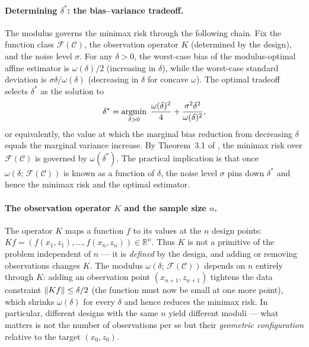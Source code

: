 \paragraph{Determining $\delta^*$: the bias--variance tradeoff.}
The modulus governs the minimax risk through the following chain.
Fix the function class $\mathcal{F}(\mathcal{C})$, the observation operator $K$ (determined by the design), and the noise level $\sigma$.
For any $\delta > 0$, the worst-case bias of the modulus-optimal affine estimator is $\omega(\delta)/2$ (increasing in $\delta$), while the worst-case standard deviation is $\sigma \delta / \omega(\delta)$ (decreasing in $\delta$ for concave $\omega$).
The optimal tradeoff selects $\delta^*$ as the solution to
\begin{equation}\label{eq:app_delta_star}
	\delta^* = \operatorname*{argmin}_{\delta > 0}\; \frac{\omega(\delta)^2}{4} + \frac{\sigma^2 \delta^2}{\omega(\delta)^2},
\end{equation}
or equivalently, the value at which the marginal bias reduction from decreasing $\delta$ equals the marginal variance increase.
By Theorem~3.1 of \textcite{armstrong_optimal_2018}, the minimax risk over $\mathcal{F}(\mathcal{C})$ is governed by $\omega(\delta^*)$.
The practical implication is that once $\omega(\delta;\, \mathcal{F}(\mathcal{C}))$ is known as a function of $\delta$, the noise level $\sigma$ pins down $\delta^*$ and hence the minimax risk and the optimal estimator.

\paragraph{The observation operator $K$ and the sample size $n$.}
The operator $K$ maps a function $f$ to its values at the $n$ design points: $Kf = (f(x_1, z_1), \ldots, f(x_n, z_n)) \in \mathbb{R}^n$.
Thus $K$ is not a primitive of the problem independent of $n$ --- it is \emph{defined} by the design, and adding or removing observations changes $K$.
The modulus $\omega(\delta;\, \mathcal{F}(\mathcal{C}))$ depends on $n$ entirely through $K$: adding an observation point $(x_{n+1}, z_{n+1})$ tightens the data constraint $\lVert Kf\rVert \leq \delta/2$ (the function must now be small at one more point), which shrinks $\omega(\delta)$ for every $\delta$ and hence reduces the minimax risk.
In particular, different designs with the same $n$ yield different moduli --- what matters is not the number of observations per se but their \emph{geometric configuration} relative to the target $(x_0, z_0)$.


